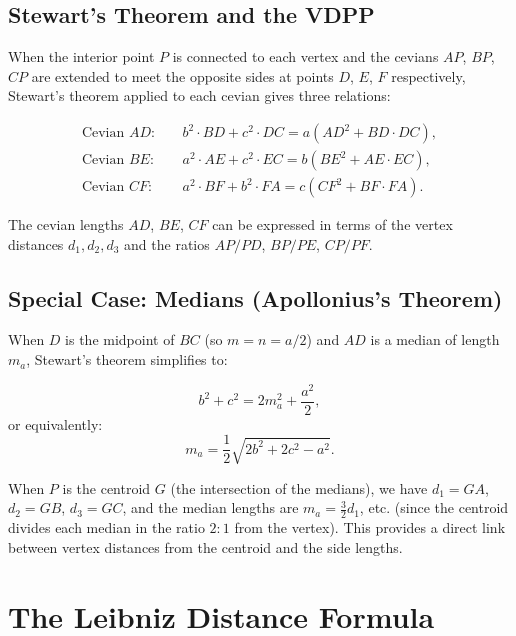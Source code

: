 \subsection{Stewart's Theorem and the VDPP}

When the interior point $P$ is connected to each vertex and the cevians $AP$, $BP$, $CP$ are extended to meet the opposite sides at points $D$, $E$, $F$ respectively, Stewart's theorem applied to each cevian gives three relations:

\begin{align}
\text{Cevian } AD: \quad & b^2 \cdot BD + c^2 \cdot DC = a(AD^2 + BD \cdot DC), \label{eq:stew-1}\\
\text{Cevian } BE: \quad & a^2 \cdot AE + c^2 \cdot EC = b(BE^2 + AE \cdot EC), \label{eq:stew-2}\\
\text{Cevian } CF: \quad & a^2 \cdot BF + b^2 \cdot FA = c(CF^2 + BF \cdot FA). \label{eq:stew-3}
\end{align}

The cevian lengths $AD$, $BE$, $CF$ can be expressed in terms of the vertex distances $d_1, d_2, d_3$ and the ratios $AP/PD$, $BP/PE$, $CP/PF$.

\subsection{Special Case: Medians (Apollonius's Theorem)}

When $D$ is the midpoint of $BC$ (so $m = n = a/2$) and $AD$ is a median of length $m_a$, Stewart's theorem simplifies to:

\begin{corollary}
\begin{equation}
\label{eq:apollonius}
b^2 + c^2 = 2m_a^2 + \frac{a^2}{2},
\end{equation}
or equivalently:
\begin{equation}
m_a = \frac{1}{2}\sqrt{2b^2 + 2c^2 - a^2}.
\end{equation}
\end{corollary}

When $P$ is the centroid $G$ (the intersection of the medians), we have $d_1 = GA$, $d_2 = GB$, $d_3 = GC$, and the median lengths are $m_a = \frac{3}{2} d_1$, etc. (since the centroid divides each median in the ratio $2:1$ from the vertex). This provides a direct link between vertex distances from the centroid and the side lengths.

\section{The Leibniz Distance Formula}

